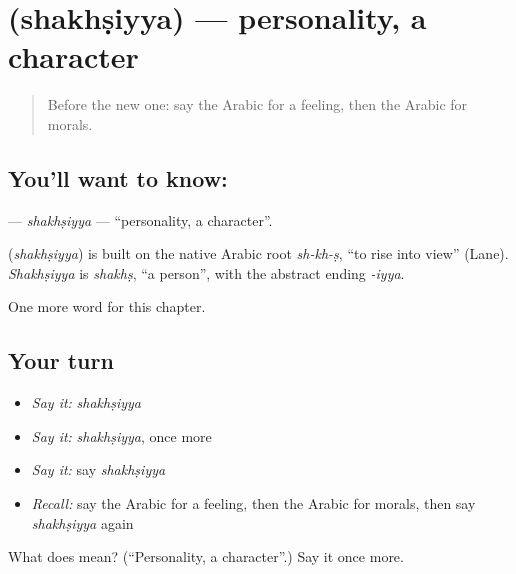 \section[\texorpdfstring{\ar{شخصية} (shakhṣiyya)}{شخصية (shakhṣiyya)}]{ (shakhṣiyya) — personality, a character}

\label{lesson:AR-C237-shakhsiyya}



\begin{quote}
Before the new one: say the Arabic for a feeling, then the Arabic for morals.
\end{quote}

\subsection*{You'll want to know: }
\textbf{} — \emph{shakhṣiyya} — \textquotedblleft{}personality, a character\textquotedblright{}.

\begin{cousinweb}
\textbf{} (\emph{shakhṣiyya}) is built on the native Arabic root \emph{sh-kh-ṣ}, \textquotedblleft{}to rise into view\textquotedblright{} (Lane). \emph{Shakhṣiyya} is \emph{shakhṣ}, \textquotedblleft{}a person\textquotedblright{}, with the abstract ending \emph{-iyya}.
\end{cousinweb}

\begin{grammarlens}[title={What you've built}]
One more word for this chapter.
\end{grammarlens}

\subsection*{Your turn}
\begin{itemize}
\raggedright
  \item \emph{Say it:} \emph{shakhṣiyya}
  \item \emph{Say it:} \emph{shakhṣiyya}, once more
  \item \emph{Say it:} say \emph{shakhṣiyya}
  \item \emph{Recall:} say the Arabic for a feeling, then the Arabic for morals, then say \emph{shakhṣiyya} again
\end{itemize}

\begin{tcolorbox}[breakable,colback=teal!4,colframe=teal!35!black,title={Before you move on}]
What does  mean? (\textquotedblleft{}Personality, a character\textquotedblright{}.) Say it once more.
\end{tcolorbox}

